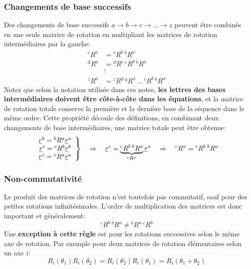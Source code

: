 \subsubsection{Changements de base successifs} 

Des changements de base successifs $a \rightarrow b \rightarrow c \rightarrow ... \rightarrow z$  peuvent être combinés en une seule matrice de rotation en multipliant les matrices de rotation intermédiaires par la gauche:
\begin{align}
{}^cR^a &=  {}^cR^b \, {}^bR^a \\
{}^dR^a &=  {}^dR^c \, {}^cR^b \, {}^bR^a \\
& \vdots \\
{}^zR^a &=  {}^zR^y \, {}^yR^x \, \hdots \, {}^cR^b \, {}^bR^a 
\end{align}
Notez que selon la notation utilisée dans ces notes, \textbf{les lettres des bases intermédiaires doivent être côte-à-côte dans les équations}, et la matrice de rotation totale conserve la première et la dernière base de la séquence dans le même ordre. Cette propriété découle des définitions, en combinant deux changements de base intermédiaires, une matrice totale peut être obtenue: 
\begin{align}
\left. \begin{array}{c}
\underline{r}^b = {}^bR^a \underline{r}^a \\  \underline{r}^c = {}^cR^b \underline{r}^b \\ \underline{r}^c = {}^cR^a \underline{r}^a 
\end{array} \right\} \quad \Rightarrow \quad \underline{r}^c = \underbrace{{}^cR^b \,  {}^bR^a}_{ {}^cR^a } \underline{r}^a \quad \Rightarrow \quad {}^cR^a  = {}^cR^b \,  {}^bR^a 
\end{align}

\subsubsection{Non-commutativité}

Le produit des matrices de rotation n'est toutefois pas commutatif, sauf pour des petites rotations infinitésimales. L'ordre de multiplication des matrices est donc important et généralement:
\begin{equation}
^cR^b \, ^bR^a \ne {}^bR^a \, ^cR^b
\end{equation} 
Une \textbf{exception à cette règle} est pour les rotations successives selon le même axe de rotation. Par exemple pour deux matrices de rotation élémentaires selon un axe $i$:
\begin{equation}
R_i( \theta_1 ) R_i( \theta_2 )  = R_i( \theta_2 ) R_i( \theta_1 ) = R_i( \theta_1 + \theta_2 )
\end{equation} 



